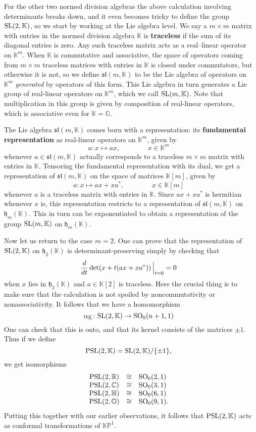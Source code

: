 \documentclass[12pt]{article}
\newcommand\R{{\mathbb R}}
\newcommand\C{{\mathbb C}}
\renewcommand\H{{\mathbb H}}
\newcommand\K{{\mathbb K}}
\renewcommand\O{{\mathbb O}}
\newcommand\KP{{\mathbb {KP}}}
\newcommand{\SO}{{\rm SO}}
\newcommand{\SL}{{\rm SL}}
\newcommand{\PSL}{{\rm PSL}}
\newcommand{\Sl}{{\mathfrak {sl}}}
\newcommand{\h}{{\mathfrak {h}}}
\newcommand{\iso}{\cong}
\newcommand{\maps}{\colon}
\begin{document}
For the other two normed division algebras the above calculation
involving determinants breaks down, and it even becomes tricky to define
the group $\SL(2,\K)$, so we start by working at the Lie algebra level.
We say a $m \times m$ matrix with entries in the normed division algebra
$\K$ is {\bf traceless} if the sum of its diagonal entries is zero.  Any
such traceless matrix acts as a real--linear operator on $\K^m$.  When
$\K$ is commutative and associative, the space of operators coming from
$m \times m$ traceless matrices with entries in $\K$ is closed under
commutators, but otherwise it is not, so we define $\Sl(m,\K)$ to be the
Lie algebra of operators on $\K^m$ {\it generated} by operators of this
form.  This Lie algebra in turn generates a Lie group of real-linear
operators on $\K^m$, which we call $\SL(m,\K)$.  Note that
multiplication in this group is given by composition of real-linear
operators, which is associative even for $\K = \O$.
 
The Lie algebra $\Sl(m,\K)$ comes born with a representation:  
its {\bf fundamental representation} as real-linear operators on $\K^m$,  
given by 
\[   a \maps x \mapsto ax ,           \qquad \qquad x \in \K^m \] 
whenever $a \in \Sl(m,\K)$ actually corresponds to a traceless $m \times 
m$ matrix with entries in $\K$.  Tensoring the fundamental representation  
with its dual, we get a representation of $\Sl(m,\K)$ on the space 
of matrices $\K[m]$, given by 
\[   a \maps x \mapsto ax + xa^*,       \qquad \qquad x \in \K[m]   \] 
whenever $a$ is a traceless matrix with entries in $\K$.  Since $ax + 
xa^*$ is hermitian whenever $x$ is, this representation restricts to a 
representation of $\Sl(m,\K)$ on $\h_m(\K)$.   This in turn can be 
exponentiated to obtain a representation of the group $\SL(m,\K)$ on 
$\h_m(\K)$. 
 
Now let us return to the case $m = 2$.  One can prove that the 
representation of $\SL(2,\K)$ on $\h_2(\K)$ is determinant-preserving 
simply by checking that 
\[    {d \over dt} \det(x + t(ax + xa^*))\, \Bigr|_{t = 0} = 0 \] 
when $x$ lies in $\h_2(\K)$ and $a \in \K[2]$ is traceless.   Here the 
crucial thing is to make sure that the calculation is not spoiled by 
noncommutativity or nonassociativity.  It follows that we have a  
homomorphism 
\[     \alpha_\K \maps \SL(2,\K) \to \SO_0(n+1,1)  \] 
One can check that this is onto, and that its kernel consists of the 
matrices $\pm 1$.  Thus if we define 
\[   \PSL(2,\K) = \SL(2,\K) / \{\pm 1\} ,  \] 
we get isomorphisms 
\[     
\begin{array}{ccl}       
          \PSL(2,\R)& \iso &\SO_0(2,1)   \\ 
          \PSL(2,\C)& \iso &\SO_0(3,1)   \\   
          \PSL(2,\H)& \iso &\SO_0(6,1)   \\    
          \PSL(2,\O)& \iso &\SO_0(9,1) .   
\end{array} 
\] 
Putting this together with our earlier observations, it follows that 
$\PSL(2,\K)$ acts as conformal transformations of $\KP^1$. 
 
\end{document}

